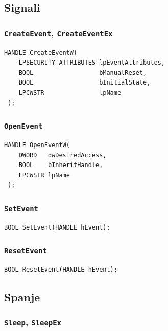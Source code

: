 \documentclass[a4paper,12pt,openright]{book}
\begin{document}
\subsection{Signali}

\subsubsection{\texttt{CreateEvent}, \texttt{CreateEventEx}}

\begin{lstlisting}[style=func]
 HANDLE CreateEventW(
	LPSECURITY_ATTRIBUTES lpEventAttributes,
	BOOL                  bManualReset,
	BOOL                  bInitialState,
	LPCWSTR               lpName
 );
\end{lstlisting}

\subsubsection{\texttt{OpenEvent}}

\begin{lstlisting}[style=func]
 HANDLE OpenEventW(
	DWORD   dwDesiredAccess,
	BOOL    bInheritHandle,
	LPCWSTR lpName
 );
\end{lstlisting}

\subsubsection{\texttt{SetEvent}}

\begin{lstlisting}[style=func]
 BOOL SetEvent(HANDLE hEvent);
\end{lstlisting}

\subsubsection{\texttt{ResetEvent}}

\begin{lstlisting}[style=func]
 BOOL ResetEvent(HANDLE hEvent);
\end{lstlisting}

\subsection{Spanje}

\subsubsection{\texttt{Sleep}, \texttt{SleepEx}}
\end{document}
